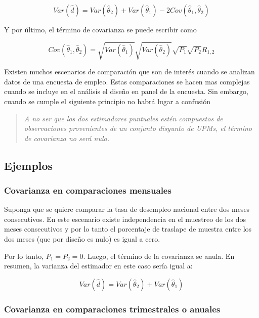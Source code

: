 \documentclass[
  12pt,
  spanish,
]{book}
\begin{document}
\[
Var(\hat{d}) 
= Var(\hat{\theta}_2) + Var(\hat{\theta}_1) - 2 Cov(\hat{\theta}_1, \hat{\theta}_2) 
\]

Y por último, el término de covarianza se puede escribir como

\[
Cov(\hat{\theta}_1, \hat{\theta}_2) = \sqrt{Var(\hat{\theta}_1)}\sqrt{Var(\hat{\theta}_2)}\sqrt{P_1}\sqrt{P_2}R_{1,2}
\]

Existen muchos escenarios de comparación que son de interés cuando se analizan datos de una encuesta de empleo. Estas comparaciones se hacen mas complejas cuando se incluye en el análisis el diseño en panel de la encuesta. Sin embargo, cuando se cumple el siguiente principio no habrá lugar a confusión

\begin{quote}
\emph{A no ser que los dos estimadores puntuales estén compuestos de observaciones provenientes de un conjunto disyunto de UPMs, el término de covarianza no será nulo.}
\end{quote}

\hypertarget{ejemplos}{%
\subsection{Ejemplos}\label{ejemplos}}

\hypertarget{covarianza-en-comparaciones-mensuales}{%
\subsubsection*{Covarianza en comparaciones mensuales}\label{covarianza-en-comparaciones-mensuales}}

Suponga que se quiere comparar la tasa de desempleo nacional entre dos meses consecutivos. En este escenario existe independencia en el muestreo de los dos meses consecutivos y por lo tanto el porcentaje de traslape de muestra entre los dos meses (que por diseño es nulo) es igual a cero.

Por lo tanto, \(P_1 = P_2 = 0\). Luego, el término de la covarianza se anula. En resumen, la varianza del estimador en este caso sería igual a:

\[
Var(\hat{d}) 
= Var(\hat{\theta}_2) + Var(\hat{\theta}_1)
\]

\hypertarget{covarianza-en-comparaciones-trimestrales-o-anuales}{%
\subsubsection*{Covarianza en comparaciones trimestrales o anuales}\label{covarianza-en-comparaciones-trimestrales-o-anuales}}
\end{document}
